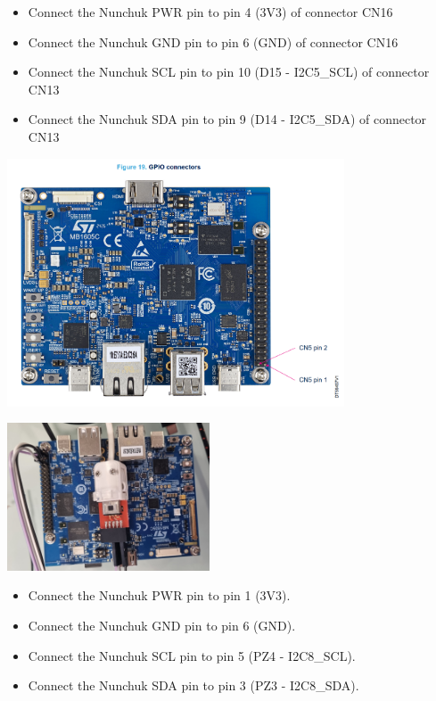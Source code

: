       \begin{itemize}
      \item Connect the Nunchuk PWR pin to pin 4 (3V3) of connector CN16
      \item Connect the Nunchuk GND pin to pin 6 (GND) of connector CN16
      \item Connect the Nunchuk SCL pin to pin 10 (D15 - I2C5\_SCL) of connector CN13
      \item Connect the Nunchuk SDA pin to pin 9 (D14 - I2C5\_SDA) of connector CN13
      \end{itemize}
\fi
\if{}
      \begin{center}
      \includegraphics[width=10cm]{labs/sysdev-accessing-hardware-stm32/stm32mp2_pin_map.png}
      
      \includegraphics[width=6cm]{labs/sysdev-accessing-hardware-stm32/stm32mp2_nunchuk.jpg}
      \end{center}

      \begin{itemize}
      \item Connect the Nunchuk PWR pin to pin 1 (3V3).
      \item Connect the Nunchuk GND pin to pin 6 (GND).
      \item Connect the Nunchuk SCL pin to pin 5 (PZ4 - I2C8\_SCL).
      \item Connect the Nunchuk SDA pin to pin 3 (PZ3 - I2C8\_SDA).
      \end{itemize}
\fi

